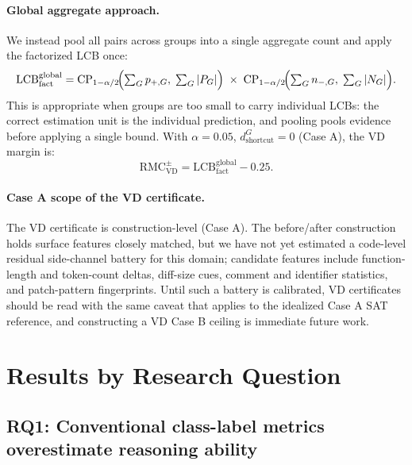 \documentclass[conference]{IEEEtran}
\theoremstyle{remark}
\newcommand{\LCB}{\mathrm{LCB}}
\newcommand{\RMCVD}{\mathrm{RMC}_{\mathrm{VD}}}
\newcommand{\shortcutDisc}{d_{\mathrm{shortcut}}^{G}}
\begin{document}
\paragraph{Global aggregate approach.}
We instead pool all pairs across groups into a single aggregate count and apply the factorized LCB once:
\begin{equation}\label{eq:formula-64}
\LCB_{\mathrm{fact}}^{\mathrm{global}}
= \mathrm{CP}_{1-\alpha/2}\!\Bigl(\textstyle\sum_G p_{+,G},\;\sum_G |P_G|\Bigr)
\;\times\;
\mathrm{CP}_{1-\alpha/2}\!\Bigl(\textstyle\sum_G n_{-,G},\;\sum_G |N_G|\Bigr).
\end{equation}
This is appropriate when groups are too small to carry individual LCBs: the correct estimation unit is the individual prediction, and pooling pools evidence before applying a single bound.
With $\alpha=0.05$, $\shortcutDisc=0$ (Case A), the VD margin is:
\begin{equation}\label{eq:formula-65}
\RMCVD^{\pm} = \LCB_{\mathrm{fact}}^{\mathrm{global}} - 0.25.
\end{equation}

\paragraph{Case A scope of the VD certificate.}
The VD certificate is construction-level (Case A).
The before/after construction holds surface features closely matched, but we have not yet estimated a code-level residual side-channel battery for this domain; candidate features include function-length and token-count deltas, diff-size cues, comment and identifier statistics, and patch-pattern fingerprints.
Until such a battery is calibrated, VD certificates should be read with the same caveat that applies to the idealized Case A SAT reference, and constructing a VD Case B ceiling is immediate future work.


\section{Results by Research Question}
\label{sec:results}

\subsection{RQ1: Conventional class-label metrics overestimate reasoning ability}
\label{sec:rq1}
\end{document}
